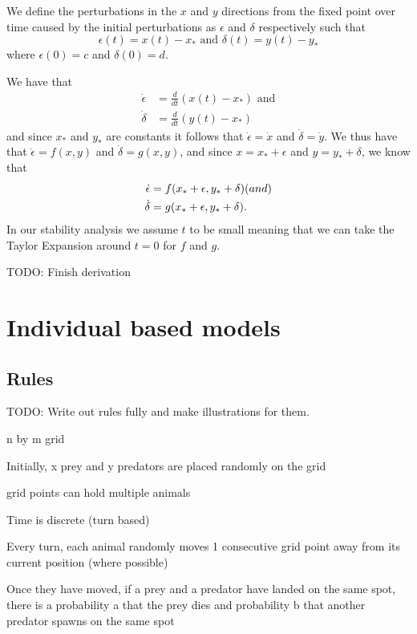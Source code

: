 \documentclass[12pt, a4paper]{article}
\begin{document}
We define the perturbations in the $x$ and $y$ directions from the fixed point over time caused by the initial perturbations as $\epsilon$ and $\delta$ respectively such that
\begin{equation}
\epsilon (t) = x(t) - x_* \text{ and } \delta (t) = y(t) - y_*
\end{equation}
where $\epsilon(0) = c$ and $\delta(0) = d$.

We have that
\begin{align}
\dot{\epsilon} &= \frac{d}{dt}(x(t)-x_*) \text { and} \\
\dot{\delta} &= \frac{d}{dt}(y(t) - x_*)
\end{align}
and since $x_*$ and $y_*$ are constants it follows that $\dot{\epsilon} = \dot{x}$ and $\dot{\delta} = \dot{y}$.
We thus have that $\dot{\epsilon} = f(x,y)$ and $\dot{\delta} = g(x,y)$, and since $x = x_* + \epsilon$ and $y = y_* + \delta$, we know that
\begin{align}
\dot{\epsilon} &= f(x_* + \epsilon, y_* + \delta) \text( and) \\
\dot{\delta} &= g(x_* + \epsilon, y_* + \delta).
\end{align}
In our stability analysis we assume $t$ to be small meaning that we can take the Taylor Expansion around $t = 0$ for $f$ and $g$.

TODO: Finish derivation

\section{Individual based models}
\subsection{Rules}
TODO: Write out rules fully and make illustrations for them.

n by m grid

Initially, x prey and y predators are placed randomly on the grid

grid points can hold multiple animals

Time is discrete (turn based)

Every turn, each animal randomly moves 1 consecutive grid point away from its current position (where possible)

Once they have moved, if a prey and a predator have landed on the same spot, there is a probability a that the prey dies and probability b that another predator spawns on the same spot
\end{document}
